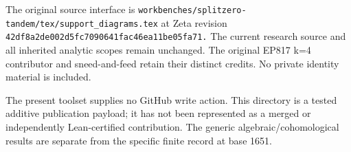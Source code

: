 The original source interface is \nolinkurl{workbenches/splitzero-tandem/tex/support_diagrams.tex} at Zeta revision \nolinkurl{42df8a2de002d5fc7090641fac46ea11be05fa71.} The current research source and all inherited analytic scopes remain unchanged. The original EP817 k=4 contributor and sneed-and-feed retain their distinct credits. No private identity material is included.

The present toolset supplies no GitHub write action. This directory is a tested additive publication payload; it has not been represented as a merged or independently Lean-certified contribution. The generic algebraic/cohomological results are separate from the specific finite record at base 1651.
